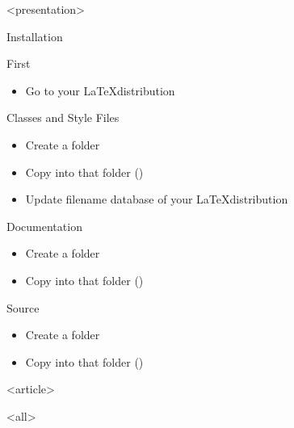 \mode
<presentation>

\begin{frame}{Installation}
  \label{start:installation}

  First
  \begin{itemize}
    \item Go to your \LaTeX distribution
  \end{itemize}

  Classes and Style Files
  \begin{itemize}
    \item Create a folder 
    \item Copy  into that folder ()
    \item Update filename database of your \LaTeX distribution
  \end{itemize}

  Documentation
  \begin{itemize}
    \item Create a folder 
    \item Copy  into that folder ()
  \end{itemize}

  Source
  \begin{itemize}
    \item Create a folder 
    \item Copy  into that folder ()
  \end{itemize}
\end{frame}




\mode
<article>

\bigskip


\clearpage

\mode
<all>
